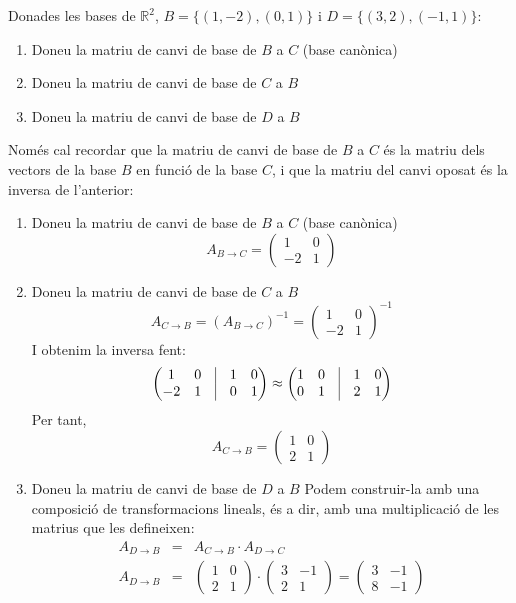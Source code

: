 \Exercise Donades les bases de $\mathbb{R}^2$, $B=\{(1,-2),(0,1)\}$ i $D=\{(3,2),(-1,1)\}$:
\begin{enumerate}[label=(\alph*)]
  \item Doneu la matriu de canvi de base de $B$ a $C$ (base canònica)
  \item Doneu la matriu de canvi de base de $C$ a $B$
  \item Doneu la matriu de canvi de base de $D$ a $B$
\end{enumerate}

\Answer Només cal recordar que la matriu de canvi de base de $B$ a $C$ és la matriu dels vectors de la base $B$ en funció de la base $C$, i que la matriu del canvi oposat és la inversa de l'anterior:
\begin{enumerate}[label=(\alph*)]
  \item Doneu la matriu de canvi de base de $B$ a $C$ (base canònica)
  \[
    A_{B\rightarrow C} = \begin{pmatrix}1&0\\-2&1\end{pmatrix}
  \]
  \blacksquare

  \item Doneu la matriu de canvi de base de $C$ a $B$
  \[
    A_{C\rightarrow B} = (A_{B\rightarrow C})^{-1} =\begin{pmatrix}1&0\\-2&1\end{pmatrix}^{-1}
  \]
  I obtenim la inversa fent:
  \[
    \begin{pmatrix}1&0& \vrule &1&0 \\-2&1& \vrule &0&1\end{pmatrix} \approx
    \begin{pmatrix}1&0& \vrule &1&0 \\0&1& \vrule &2&1\end{pmatrix}
  \]
  Per tant,
  \[
    A_{C\rightarrow B} = \begin{pmatrix}1&0\\2&1\end{pmatrix}
  \]
  \blacksquare

  \item Doneu la matriu de canvi de base de $D$ a $B$
  Podem construir-la amb una composició de transformacions lineals, és a dir, amb una multiplicació de les matrius que les defineixen:
  \begin{eqnarray*}
    A_{D\rightarrow B} &=& A_{C\rightarrow B}\cdot A_{D\rightarrow C}\\
    A_{D\rightarrow B} &=& \begin{pmatrix}1&0\\2&1\end{pmatrix} \cdot
    \begin{pmatrix}3&-1\\2&1\end{pmatrix}=
    \begin{pmatrix}3&-1\\8&-1\end{pmatrix}
  \end{eqnarray*}
  \blacksquare

\end{enumerate}
